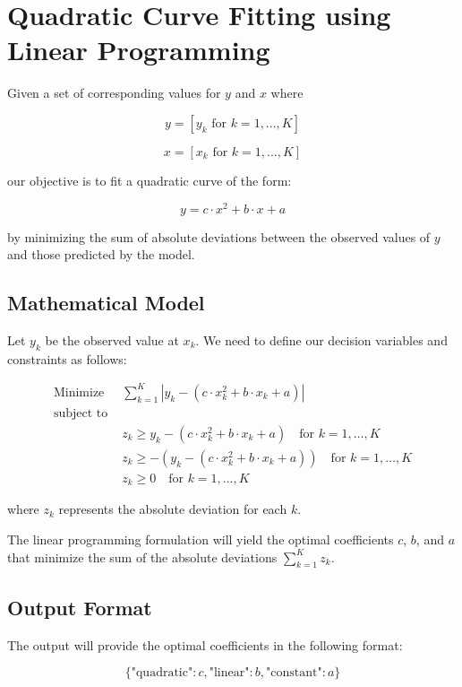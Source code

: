 \documentclass{article}
\begin{document}
\section*{Quadratic Curve Fitting using Linear Programming}

Given a set of corresponding values for \(y\) and \(x\) where

\[
y = [y_{k} \text{ for } k = 1,...,K]
\]

\[
x = [x_{k} \text{ for } k = 1,...,K]
\]

our objective is to fit a quadratic curve of the form:

\[
y = c \cdot x^2 + b \cdot x + a
\]

by minimizing the sum of absolute deviations between the observed values of \(y\) and those predicted by the model.

\subsection*{Mathematical Model}

Let \( y_k \) be the observed value at \( x_k \). We need to define our decision variables and constraints as follows:

\begin{align*}
\text{Minimize } & \sum_{k=1}^{K} |y_k - (c \cdot x_k^2 + b \cdot x_k + a)| \\
\text{subject to } & \\
& z_k \geq y_k - (c \cdot x_k^2 + b \cdot x_k + a) \quad \text{for } k = 1, \ldots, K \\
& z_k \geq -(y_k - (c \cdot x_k^2 + b \cdot x_k + a)) \quad \text{for } k = 1, \ldots, K \\
& z_k \geq 0 \quad \text{for } k = 1, \ldots, K
\end{align*}

where \( z_k \) represents the absolute deviation for each \( k \).

The linear programming formulation will yield the optimal coefficients \(c\), \(b\), and \(a\) that minimize the sum of the absolute deviations \( \sum_{k=1}^{K} z_k \).

\subsection*{Output Format}

The output will provide the optimal coefficients in the following format:

\[
\{
    \text{"quadratic"}: c,
    \text{"linear"}: b,
    \text{"constant"}: a
\}
\]
\end{document}
